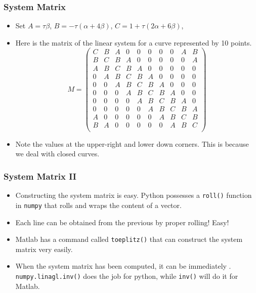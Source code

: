 \documentclass[10pt]{beamer}
\newcommand{\myemph}[1]{{\color{blue}{#1}}}
\begin{document}
 \begin{frame}
   \frametitle{System Matrix}
   \begin{itemize}
   \item Set $A = \tau\beta$, $B = -\tau(\alpha + 4\beta)$, $C = 1+ \tau(2\alpha + 6\beta)$,
   \item   Here is the matrix of the linear system for a curve represented by  10 points.
     {\small $$ M = 
       \begin{pmatrix}
         C & B & A & 0 & 0 & 0 & 0 & 0 & A & B \\
         B & C & B & A & 0 & 0 & 0 & 0 & 0 & A \\
         A & B & C & B & A & 0 & 0 & 0 & 0 & 0 \\
         0 & A & B & C & B & A & 0 & 0 & 0 & 0 \\
         0 & 0 & A & B & C & B & A & 0 & 0 & 0 \\
         0 & 0 & 0 & A & B & C & B & A & 0 & 0 \\
         0 & 0 & 0 & 0 & A & B & C & B & A & 0 \\
         0 & 0 & 0 & 0 & 0 & A & B & C & B & A \\
         A & 0 & 0 & 0 & 0 & 0 & A & B & C & B \\
         B & A & 0 & 0 & 0 & 0 & 0 & A & B & C \\
       \end{pmatrix}
       $$}
   \item
     Note the values at the upper-right and lower down corners. This is
     because we deal with closed curves.
   \end{itemize}
 \end{frame}
 
 
 \begin{frame}
   \frametitle{System Matrix II}
   \begin{itemize}
   \item Constructing the system matrix is easy. Python possesses a \texttt{roll()} function
     in \texttt{numpy} that rolls and wraps the content of a vector. 
   \item Each line can be obtained from the previous by proper rolling! Easy!
   \item Matlab has a command called \texttt{toeplitz()} that can construct the system matrix
     very easily.
   \item When the system matrix has been computed, it can be immediately
     \myemph{inverted}. \texttt{numpy.linagl.inv()} does the job for python, while \texttt{inv()} will do it for Matlab.
   \end{itemize}
 \end{frame}
\end{document}
